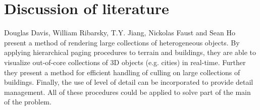 \chapter{Discussion of literature}
\label{chap:DiscussionOfLiterature}
Douglas Davis, William Ribarsky, T.Y. Jiang, Nickolas Faust and Sean Ho \cite{Davis} present a method of rendering large collections of heterogeneous objects. By applying hierarchical paging procedures to terrain and buildings, they are able to visualize out-of-core collections of 3D objects (e.g. cities) in real-time. Further they present a method for efficient handling of culling on large collections of buildings. Finally, the use of level of detail can be incorporated to provide detail management. All of these procedures could be applied to solve part of the main of the problem. 